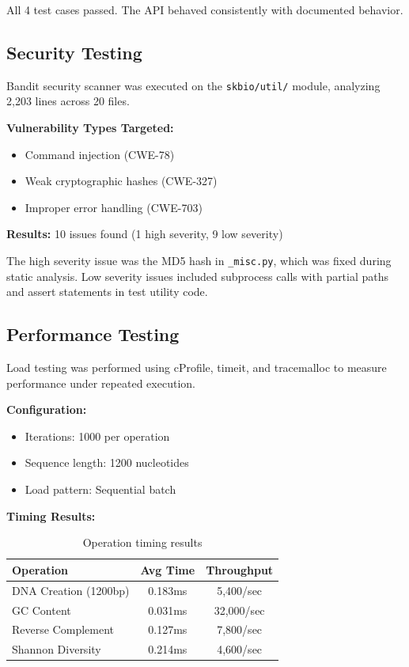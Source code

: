 \documentclass[11pt]{article}
\begin{document}
All 4 test cases passed. The API behaved consistently with documented behavior.

\subsection{Security Testing}

Bandit security scanner was executed on the \texttt{skbio/util/} module, analyzing 2,203 lines across 20 files.

\textbf{Vulnerability Types Targeted:}
\begin{itemize}[noitemsep]
    \item Command injection (CWE-78)
    \item Weak cryptographic hashes (CWE-327)
    \item Improper error handling (CWE-703)
\end{itemize}

\textbf{Results:} 10 issues found (1 high severity, 9 low severity)

The high severity issue was the MD5 hash in \texttt{\_misc.py}, which was fixed during static analysis. Low severity issues included subprocess calls with partial paths and assert statements in test utility code.

\subsection{Performance Testing}

Load testing was performed using cProfile, timeit, and tracemalloc to measure performance under repeated execution.

\textbf{Configuration:}
\begin{itemize}[noitemsep]
    \item Iterations: 1000 per operation
    \item Sequence length: 1200 nucleotides
    \item Load pattern: Sequential batch
\end{itemize}

\textbf{Timing Results:}
\begin{table}[h]
\centering
\begin{tabular}{lcc}
\toprule
\textbf{Operation} & \textbf{Avg Time} & \textbf{Throughput} \\
\midrule
DNA Creation (1200bp) & 0.183ms & 5,400/sec \\
GC Content & 0.031ms & 32,000/sec \\
Reverse Complement & 0.127ms & 7,800/sec \\
Shannon Diversity & 0.214ms & 4,600/sec \\
\bottomrule
\end{tabular}
\caption{Operation timing results}
\end{table}
\end{document}
